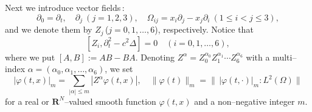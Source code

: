 \documentclass[12pt]{amsart}
\newcommand{\R}{{\mathbf R}}
\numberwithin{equation}{section}
\begin{document}
Next we introduce vector fields\,:
\begin{equation}\nonumber %
\partial_0=\partial_t, \quad \partial_j \ (j=1,2,3), \quad
\Omega_{ij}=x_i \partial_j-x_j\partial_i \ (1\le i<j \le 3),
\end{equation}
and we denote them by $Z_j$\,($j=0, 1, \dots, 6$), respectively.
Notice that 
\begin{equation}\label{commute}
[Z_i,\partial_t^2-c^2\Delta]=0 \quad (i=0, 1, \dots, 6),
\end{equation}
where we put $[A,B]:=AB-BA$.
Denoting $Z^\alpha=Z_0^{\alpha_0}Z_1^{\alpha_1}
 \cdots Z_{6}^{\alpha_{6}}$ with a multi--index
$\alpha=(\alpha_0, \alpha_1, \dots, \alpha_{6})$, we set
\begin{equation}\label{norm}
|\varphi (t,x)|_m=\sum_{|\alpha| \le m} |Z^\alpha \varphi(t,x)|,
\quad
\|\varphi(t)\|_m=\|\,|\varphi(t,\cdot)|_m\!:\!{L^2(\Omega)}\|
\end{equation}
for a real or $\R^N$--valued smooth function $\varphi(t,x)$ and 
a non--negative integer $m$.
\end{document}
